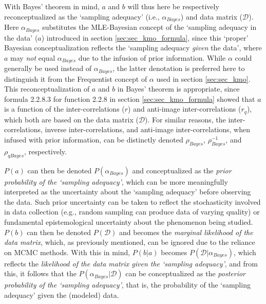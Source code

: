 \documentclass[
  10pt,
  a4paper,
  twoside]{article}
\begin{document}
With Bayes' theorem in mind, \(a\) and \(b\) will thus here be respectively reconceptualized as the `sampling adequacy' (i.e., \(\alpha_{Bayes}\)) and data matrix (\(\mathcal{D}\)). Here \(\alpha_{Bayes}\) substitutes the MLE-Bayesian concept of the `sampling adequacy in the data' (\(a\)) introduced in section \ref{sec:sec_kmo_formula}, since this `proper' Bayesian conceptualization reflects the `sampling adequacy \emph{given} the data', where \(a\) may \emph{not} equal \(\alpha_{Bayes}\) due to the infusion of prior information. While \(\alpha\) could generally be used instead of \(\alpha_{Bayes}\), the latter denotation is preferred here to distinguish it from the Frequentist concept of \(\alpha\) used in section \ref{sec:sec_kmo}. This reconceptualization of \(a\) and \(b\) in Bayes' theorem is appropriate, since formula 2.2.8.3 for function 2.2.8 in section \ref{sec:sec_kmo_formula} showed that \(a\) is a function of the inter-correlations (\(r\)) and anti-image inter-correlations (\(r_q\)), which both are based on the data matrix (\(\mathcal{D}\)). For similar reasons, the inter-correlations, inverse inter-correlations, and anti-image inter-correlations, when infused with prior information, can be distinctly denoted \(\rho_{Bayes}\), \(\rho_{Bayes}^{-1}\), and \(\rho_{qBayes}\), respectively.

\(P(a)\) can then be denoted \(P(\alpha_{Bayes})\) and conceptualized as the \emph{prior probability of the `sampling adequacy'}, which can be more meaningfully interpreted as the uncertainty about the `sampling adequacy' before observing the data. Such prior uncertainty can be taken to reflect the stochasticity involved in data collection (e.g., random sampling can produce data of varying quality) or fundamental epistemological uncertainty about the phenomenon being studied. \(P(b)\) can then be denoted \(P(\mathcal{D})\) and becomes the \emph{marginal likelihood of the data matrix}, which, as previously mentioned, can be ignored due to the reliance on MCMC methods. With this in mind, \(P(b|a)\) becomes \(P(\mathcal{D}|\alpha_{Bayes})\), which reflects the \emph{likelihood of the data matrix given the `sampling adequacy'}, and from this, it follows that the \(P(\alpha_{Bayes}|\mathcal{D})\) can be conceptualized as the \emph{posterior probability of the `sampling adequacy'}, that is, the probability of the `sampling adequacy' given the (modeled) data.
\end{document}
